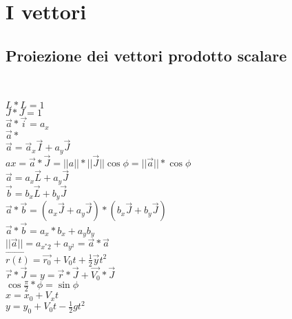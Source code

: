 \documentclass{book}
\begin{document}
\section{I vettori}
\subsection{Proiezione dei vettori prodotto scalare}
\\
\begin{multicols}{3} 
$L*L=1$\\
$J*J=1$\\
$\overrightarrow{a}*\overrightarrow{i}=a_x$\\
$\overrightarrow{a}*$\\
$\overrightarrow{a}=\overrightarrow{a}_x\overrightarrow{I}+a_y\overrightarrow{J}$\\
$ax=\overrightarrow{a}*\overrightarrow{J}=||a||*||\overrightarrow{J}||\cos{\phi}=||\overrightarrow{a}||*\cos{\phi}$\\
$\overrightarrow{a}=a_x\overrightarrow{L}+a_y\overrightarrow{J}$\\
$\overrightarrow{b}=b_x\overrightarrow{L}+b_y\overrightarrow{J}$\\
$\overrightarrow{a}*\overrightarrow{b}=(a_x\overrightarrow{J}+a_y\overrightarrow{J})*(b_x\overrightarrow{J}+b_y\overrightarrow{J})$\\
$\overrightarrow{a}*\overrightarrow{b}=a_x*b_x+a_yb_y$\\
$||\overrightarrow{a}||=a_{x^*2}+a_{y^2}=\overrightarrow{a}*\overrightarrow{a}$\\
$\overrightarrow{r(t)}=\overrightarrow{r_0}+V_0t+\frac{1}{2}\overrightarrow{y}t^2$\\
$\overrightarrow{r}*\overrightarrow{J}=y=\overrightarrow{r}*\overrightarrow{J}+\overrightarrow{V_0}*\overrightarrow{J}$\\
$\cos{\frac{\pi}{2}*\phi}=\sin{\phi}$\\
$x=x_0+V_xt$\\
$y=y_0+V_0t-\frac{1}{2}gt^2$\\
\end{multicols} 
\end{document}
